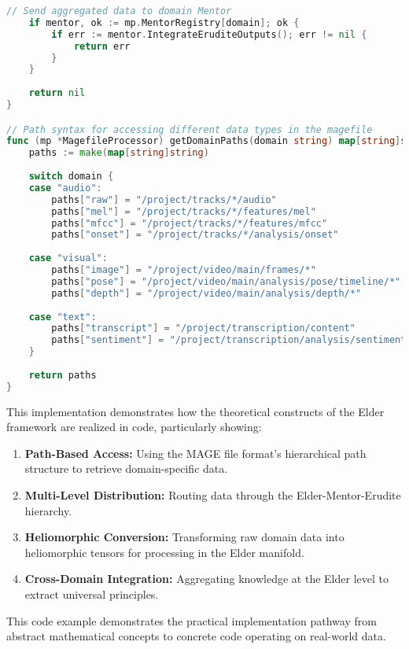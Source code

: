 \begin{algorithm}
\begin{lstlisting}[language=Go]
    // Send aggregated data to domain Mentor
    if mentor, ok := mp.MentorRegistry[domain]; ok {
        if err := mentor.IntegrateEruditeOutputs(); err != nil {
            return err
        }
    }
    
    return nil
}

// Path syntax for accessing different data types in the magefile
func (mp *MagefileProcessor) getDomainPaths(domain string) map[string]string {
    paths := make(map[string]string)
    
    switch domain {
    case "audio":
        paths["raw"] = "/project/tracks/*/audio"
        paths["mel"] = "/project/tracks/*/features/mel"
        paths["mfcc"] = "/project/tracks/*/features/mfcc"
        paths["onset"] = "/project/tracks/*/analysis/onset"
        
    case "visual":
        paths["image"] = "/project/video/main/frames/*"
        paths["pose"] = "/project/video/main/analysis/pose/timeline/*"
        paths["depth"] = "/project/video/main/analysis/depth/*"
        
    case "text":
        paths["transcript"] = "/project/transcription/content"
        paths["sentiment"] = "/project/transcription/analysis/sentiment"
    }
    
    return paths
}
\end{lstlisting}
\end{algorithm}

This implementation demonstrates how the theoretical constructs of the Elder framework are realized in code, particularly showing:

\begin{enumerate}
    \item \textbf{Path-Based Access:} Using the MAGE file format's hierarchical path structure to retrieve domain-specific data.
    \item \textbf{Multi-Level Distribution:} Routing data through the Elder-Mentor-Erudite hierarchy.
    \item \textbf{Heliomorphic Conversion:} Transforming raw domain data into heliomorphic tensors for processing in the Elder manifold.
    \item \textbf{Cross-Domain Integration:} Aggregating knowledge at the Elder level to extract universal principles.
\end{enumerate}

This code example demonstrates the practical implementation pathway from abstract mathematical concepts to concrete code operating on real-world data.

